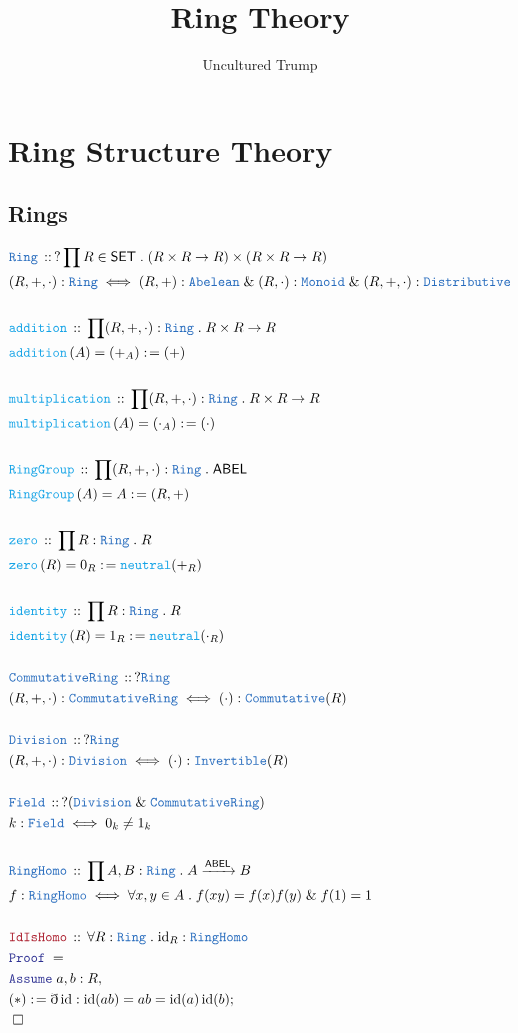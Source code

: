 \documentclass[12pt]{scrartcl}
\title{Ring Theory}
\author{Uncultured Trump}
\newcommand{\TYPE}[1]{\textcolor{NavyBlue}{\mathtt{#1}}}
\newcommand{\FUNC}[1]{\textcolor{Cerulean}{\mathtt{#1}}}
\newcommand{\LOGIC}[1]{\textcolor{Blue}{\mathtt{#1}}}
\newcommand{\THM}[1]{\textcolor{Maroon}{\mathtt{#1}}}
\renewcommand{\.}{\; . \;}
\newcommand{\de}{: \kern 0.1pc =}
\newcommand{\Act}[1]{\left( #1 \right)}
\newcommand{\Theorem}[2]{& \THM{#1} \, :: \, #2 \\ & \Proof = \\ }
\newcommand{\DeclareType}[2]{& \TYPE{#1} \, :: \, #2 \\}
\newcommand{\DefineType}[3]{& #1 : \TYPE{#2} \iff #3 \\}
\newcommand{\DeclareFunc}[2]{& \FUNC{#1} \, :: \, #2 \\}
\newcommand{\DefineNamedFunc}[4]{&  \FUNC{#1}\Act{#2} = #3 \de #4 \\}
\newcommand{\Page}[1]{ \begin{align*} #1 \end{align*}   }
\newcommand{ \bd }{ \ByDef }
\renewcommand{\And}{\; \& \;}
\DeclareMathOperator*{\id}{id}
\newcommand{\Conclude}[3]{& #1 \de #2 : #3; \\}
\newcommand{\Assume}[2]{& \LOGIC{Assume} \; #1 : #2, \\}
\newcommand{\QED}{\; \square}
\newcommand{\EndProof}{& \QED \\}
\newcommand{\ByDef}{\eth}
\newcommand{\Proof}{\LOGIC{Proof} \; }
\newcommand{\Arrow}[1]{\xrightarrow{#1}}
\newcommand{\SET}{\mathsf{SET}}
\newcommand{\ABEL}{\mathsf{ABEL}}
\newcommand{\Ring}{\TYPE{Ring}}
\newcommand{\CR}{\TYPE{CommutativeRing}}
\begin{document}
\maketitle
\newpage
\tableofcontents
\newpage
\section{Ring Structure Theory}
\subsection{Rings}
\Page{
	\DeclareType{Ring}{ ? \prod R \in \SET \. (R \times R \to R) \times (R \times R \to R)}
	\DefineType{(R,+,\cdot)}{Ring}{(R,+) : \TYPE{Abelean} \And (R,\cdot) : \TYPE{Monoid} \And (R,+,\cdot) : \TYPE{Distributive}}
	\\
	\DeclareFunc{addition}{\prod (R,+,\cdot) : \Ring \. R \times R \to R }
	\DefineNamedFunc{addition}{A}{(+_A)}{(+)}
	\\
	\DeclareFunc{multiplication}{\prod (R,+,\cdot) : \Ring \.R \times R \to R}
	\DefineNamedFunc{multiplication}{A}{(\cdot_A)}{(\cdot)}
	\\	
	\DeclareFunc{RingGroup}{\prod (R,+,\cdot) : \Ring \. \ABEL}
	\DefineNamedFunc{RingGroup}{A}{A}{(R,+)}
	\\
	\DeclareFunc{zero}{\prod R : \Ring \. R}
	\DefineNamedFunc{zero}{R}{0_R}{ \FUNC{neutral}(+_R) }
	\\
	\DeclareFunc{identity}{\prod R : \Ring \. R}
	\DefineNamedFunc{identity}{R}{1_R}{\FUNC{neutral}(\cdot_R)}
	\\
	\DeclareType{CommutativeRing}{?\Ring}
	\DefineType{(R,+,\cdot)}{CommutativeRing}{(\cdot) : \TYPE{Commutative}(R)}
	\\
	\DeclareType{Division}{?\Ring}
	\DefineType{(R,+,\cdot)}{Division}{(\cdot) : \TYPE{Invertible}(R)}
	\\
	\DeclareType{Field}{?(\TYPE{Division} \And \CR)}
	\DefineType{k}{Field}{  0_k \neq 1_k  }
	\\
	\DeclareType{RingHomo}{\prod A,B : \Ring \. A \Arrow{\ABEL} B}
	\DefineType{f}{RingHomo}{\forall x,y \in A \. f(xy) = f(x)f(y) \And f(1) = 1 }  
	\\
	\Theorem{IdIsHomo}{\forall R : \Ring \. {\id}_{R} : \TYPE{RingHomo}}
	\Assume{a,b}{R}
	\Conclude{(*)}{ \bd \id   }{  \id(ab) = ab  =\id(a)\id(b) }
	\EndProof
	\\
}
\end{document}

